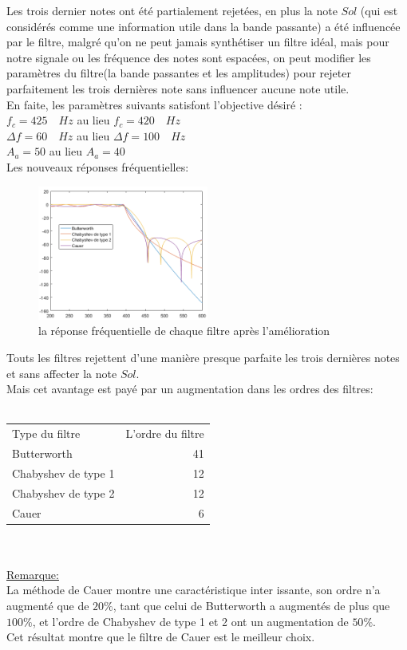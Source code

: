\documentclass[twoside,twocolumn]{article}
\begin{document}
Les trois dernier notes ont été partialement rejetées, en plus la note $Sol$ (qui est considérés comme une information utile dans la bande passante) a été influencée par le filtre, malgré qu'on ne peut jamais synthétiser un filtre idéal, mais pour notre signale ou les fréquence des notes sont espacées, on peut modifier les paramètres du filtre(la bande passantes et les amplitudes) pour rejeter parfaitement les trois dernières note sans influencer aucune note utile.\\
 En faite, les paramètres suivants satisfont l'objective désiré :\\
$f_c = 425\quad Hz$  \quad au lieu  \quad $f_c = 420\quad Hz$ \\
$\Delta f = 60\quad Hz$ \quad au lieu \quad $\Delta f = 100\quad Hz$ \\
$A_a = 50$ \quad au lieu \quad $A_a = 40$\\
	Les nouveaux réponses fréquentielles:
\begin{figure}[H]
\centering
\includegraphics[width=0.5\textwidth]{Images/4.png}
\caption{ la réponse fréquentielle de chaque filtre après l'amélioration}
\end{figure}
Touts les filtres rejettent d'une manière presque parfaite les trois dernières notes et sans affecter la note $Sol$.\\
	Mais cet avantage est payé par un augmentation dans les ordres des filtres:\\
	\\
	\begin{tabular}{l|r}
Type du filtre & L'ordre du filtre \\
Butterworth & 41 \\
Chabyshev de type 1 & 12\\
Chabyshev de type 2 & 12\\
Cauer &  6\\
\end{tabular}
\\
\\
\underline{Remarque:}\\
La méthode de Cauer montre une caractéristique inter issante, son ordre n'a augmenté que de $20\%$, tant  
que celui de Butterworth a augmentés de plus que $100\%$, et l'ordre de Chabyshev de type 1 et 2 ont un augmentation de  $50\%$.\\
Cet résultat montre que le filtre de Cauer est le meilleur choix.
\end{document}
